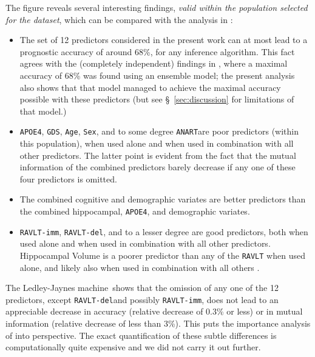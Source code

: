 \documentclass[utf8]{FrontiersinHarvard} %
\newcommand*{\sect}{\S}%
\renewcommand*{\|}[1][]{\nonscript\:#1\vert\nonscript\:\mathopen{}}
\newcommand*{\age}{\texttt{Age}}
\newcommand*{\sex}{\texttt{Sex}}
\newcommand*{\apoe}{\texttt{APOE4}}
\newcommand*{\anart}{\texttt{ANART}}
\newcommand*{\gds}{\texttt{GDS}}
\newcommand*{\ravltimm}{\texttt{RAVLT-imm}}
\newcommand*{\ravltdel}{\texttt{RAVLT-del}}
\newcommand*{\ljm}{Ledley-Jaynes machine}
\begin{document}
The figure reveals several interesting findings, \emph{valid within the population selected for the dataset}, which can be compared with the analysis in  \citet[see especially Fig.~3 and Table~3]{ryeetal2022}:
\begin{itemize}
\item The set of 12 predictors considered in the present work \citep[and in ][]{ryeetal2022} can at most lead to a prognostic accuracy of around 68\%, for any inference algorithm. This fact agrees with the (completely independent) findings in \citet{ryeetal2022}, where a maximal accuracy of 68\% was found using an ensemble model; the present analysis also shows that that model managed to achieve the maximal accuracy possible with these predictors (but see \sect~\ref{sec:discussion} for limitations of that model.)
\item \apoe, \gds, \age, \sex, and to some degree \anart are poor predictors (within this population), when used alone and when used in combination with all other predictors. The latter point is evident from the fact that the mutual information of the combined predictors barely decrease if any one of these four predictors is omitted.
\item The combined cognitive and demographic variates are better predictors than the combined hippocampal, \apoe, and demographic variates.
\item \ravltimm, \ravltdel, and to a lesser degree are good predictors, both when used alone and when used in combination with all other predictors. Hippocampal Volume is a poorer predictor than any of the \texttt{RAVLT} when used alone, and likely also when used in combination with all others \citep[contrast this with][]{ryeetal2022}.
\end{itemize}

The \ljm\ shows that the omission of any one of the 12 predictors, except \ravltdel and possibly \ravltimm, does not lead to an appreciable decrease in accuracy (relative decrease of 0.3\% or less) or in mutual information (relative decrease of less than 3\%). This puts the importance analysis of \citet{ryeetal2022} into perspective. The exact quantification of these subtle differences is computationally quite expensive and we did not carry it out further.
\end{document}
